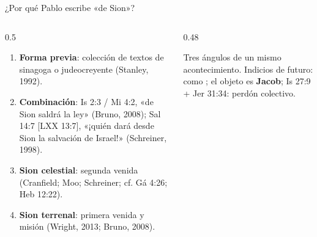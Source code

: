 \begin{frame}{¿Por qué Pablo escribe «de Sion»?}
\begin{columns}[T,onlytextwidth]
\begin{column}{0.5\textwidth}\scriptsize
\begin{enumerate}
\item \textbf{Forma previa}: colección de textos de sinagoga o judeocreyente (Stanley, 1992).
\item \textbf{Combinación}: Is 2:3 / Mi 4:2, «de Sion saldrá la ley» (Bruno, 2008); Sal 14:7 [LXX 13:7], «¡quién dará desde Sion la salvación de Israel!» (Schreiner, 1998).
\item \textbf{Sion celestial}: segunda venida (Cranfield; Moo; Schreiner; cf. Gá 4:26; Heb 12:22).
\item \textbf{Sion terrenal}: primera venida y misión (Wright, 2013; Bruno, 2008).
\end{enumerate}
\end{column}
\begin{column}{0.48\textwidth}
\centering
{}\elabpropia
\begin{clave}Tres ángulos de un mismo acontecimiento. Indicios de futuro:  como ; el objeto es \textbf{Jacob}; Is 27:9 + Jer 31:34: perdón colectivo.\end{clave}
{\scriptsize{}}
\end{column}
\end{columns}
\end{frame}

